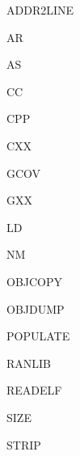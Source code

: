 \begin{description}
\item{ADDR2LINE}
\item{AR}
\item{AS}
\item{CC}
\item{CPP}
\item{CXX}
\item{GCOV}
\item{GXX}
\item{LD}
\item{NM}
\item{OBJCOPY}
\item{OBJDUMP}
\item{POPULATE}
\item{RANLIB}
\item{READELF}
\item{SIZE}
\item{STRIP}
\end{description}


